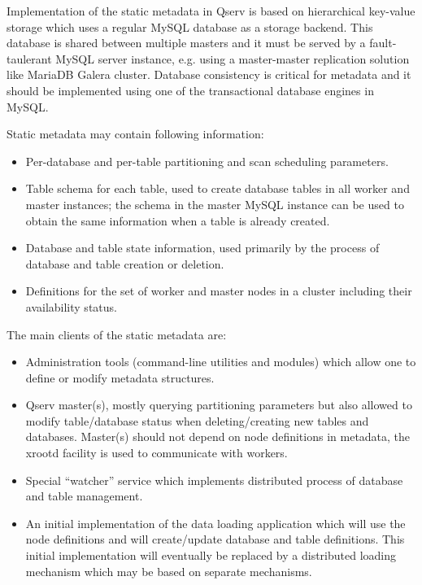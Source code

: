 \documentclass[DM,lsstdraft,toc]{lsstdoc}
\begin{document}
Implementation of the static metadata in Qserv is based on hierarchical
key-value storage which uses a regular MySQL database as a storage
backend. This database is shared between multiple masters and it must be
served by a fault-taulerant MySQL server instance, e.g. using a
master-master replication solution like MariaDB Galera cluster. Database
consistency is critical for metadata and it should be implemented using
one of the transactional database engines in MySQL.

Static metadata may contain following information:

\begin{itemize}
\item
  Per-database and per-table partitioning and scan scheduling
  parameters.
\item
  Table schema for each table, used to create database tables in all
  worker and master instances; the schema in the master MySQL instance
  can be used to obtain the same information when a table is already
  created.
\item
  Database and table state information, used primarily by the process of
  database and table creation or deletion.
\item
  Definitions for the set of worker and master nodes in a cluster
  including their availability status.
\end{itemize}

The main clients of the static metadata are:

\begin{itemize}
\item
  Administration tools (command-line utilities and modules) which allow
  one to define or modify metadata structures.
\item
  Qserv master(s), mostly querying partitioning parameters but also
  allowed to modify table/database status when deleting/creating new
  tables and databases. Master(s) should not depend on node definitions
  in metadata, the xrootd facility is used to communicate with workers.
\item
  Special ``watcher'' service which implements distributed process of
  database and table management.
\item
  An initial implementation of the data loading application which will
  use the node definitions and will create/update database and table
  definitions. This initial implementation will eventually be replaced
  by a distributed loading mechanism which may be based on separate
  mechanisms.
\end{itemize}
\end{document}
